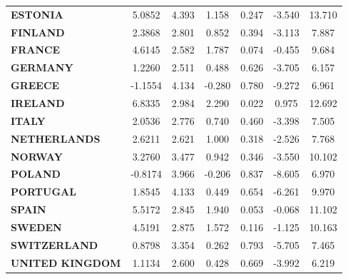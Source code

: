 \documentclass[ 11pt]{article}
\begin{document}
\begin{center}
\begin{tabular}{lcccccc}
\textbf{ESTONIA}        &       5.0852  &        4.393     &     1.158  &         0.247        &       -3.540    &       13.710     \\
\textbf{FINLAND}        &       2.3868  &        2.801     &     0.852  &         0.394        &       -3.113    &        7.887     \\
\textbf{FRANCE}         &       4.6145  &        2.582     &     1.787  &         0.074        &       -0.455    &        9.684     \\
\textbf{GERMANY}        &       1.2260  &        2.511     &     0.488  &         0.626        &       -3.705    &        6.157     \\
\textbf{GREECE}         &      -1.1554  &        4.134     &    -0.280  &         0.780        &       -9.272    &        6.961     \\
\textbf{IRELAND}        &       6.8335  &        2.984     &     2.290  &         0.022        &        0.975    &       12.692     \\
\textbf{ITALY}          &       2.0536  &        2.776     &     0.740  &         0.460        &       -3.398    &        7.505     \\
\textbf{NETHERLANDS}    &       2.6211  &        2.621     &     1.000  &         0.318        &       -2.526    &        7.768     \\
\textbf{NORWAY}         &       3.2760  &        3.477     &     0.942  &         0.346        &       -3.550    &       10.102     \\
\textbf{POLAND}         &      -0.8174  &        3.966     &    -0.206  &         0.837        &       -8.605    &        6.970     \\
\textbf{PORTUGAL}       &       1.8545  &        4.133     &     0.449  &         0.654        &       -6.261    &        9.970     \\
\textbf{SPAIN}          &       5.5172  &        2.845     &     1.940  &         0.053        &       -0.068    &       11.102     \\
\textbf{SWEDEN}         &       4.5191  &        2.875     &     1.572  &         0.116        &       -1.125    &       10.163     \\
\textbf{SWITZERLAND}    &       0.8798  &        3.354     &     0.262  &         0.793        &       -5.705    &        7.465     \\
\textbf{UNITED KINGDOM} &       1.1134  &        2.600     &     0.428  &         0.669        &       -3.992    &        6.219     \\

\end{tabular}
\end{center}
\end{document}
